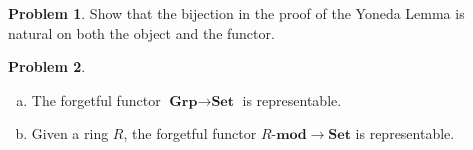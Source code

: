 \documentclass[11pt]{article}
\theoremstyle{definition}
\newtheorem{problem}{Problem}
\begin{document}
\begin{problem}
	Show that the bijection in the proof of the Yoneda Lemma is natural on both the object and the functor.
\end{problem}



\begin{problem} $\,$
	\begin{enumerate}[a)]
		\item The forgetful functor $\textbf{Grp} \longrightarrow \textbf{Set}$ is representable.
		\item Given a ring $R$, the forgetful functor $R\textbf{-mod} \longrightarrow \textbf{Set}$ is representable.
	\end{enumerate}
\end{problem}
\end{document}

